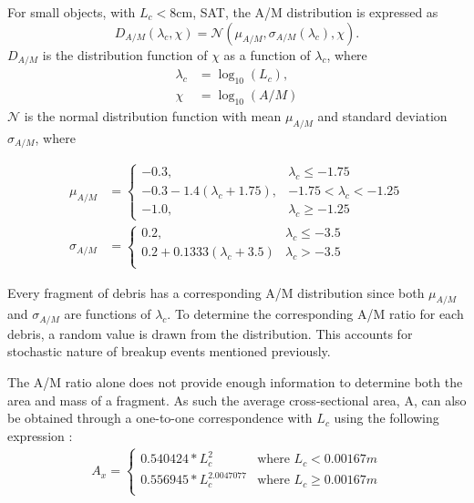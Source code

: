 \documentclass{article}
\begin{document}
For small objects, with $L_c < 8$cm, SAT, the A/M distribution is expressed as
\begin{equation}
	D_{A/M}(\lambda_c, \chi) = \mathcal{N}(\mu_{A/M}, \sigma_{A/M}(\lambda_c), \chi).
\end{equation}
$D_{A/M}$ is the distribution function of $\chi$ as a function of $\lambda_c$, where
\begin{align}
	\lambda_c &= \log_{10}(L_c),\\
	\chi &= \log_{10}(A/M)
\end{align}
$\mathcal{N}$ is the normal distribution function with mean $\mu_{A/M}$ and standard deviation $\sigma_{A/M}$, where

\begin{align}
	 \mu_{A/M} &= \begin{cases} 
		-0.3, & \lambda_c\leq -1.75 \\
		-0.3 - 1.4(\lambda_c + 1.75), & -1.75 < \lambda_c <-1.25 \\
		-1.0, & \lambda_c \geq -1.25 
	\end{cases}\\
	\sigma_{A/M} &= \begin{cases} 
		0.2, & \lambda_c \leq -3.5 \\
		0.2 + 0.1333(\lambda_c + 3.5) & \lambda_c > -3.5 \\
	\end{cases}
\end{align}

Every fragment of debris has a corresponding A/M distribution since both $\mu_{A/M}$ and $\sigma_{A/M}$ are functions of $\lambda_c$. To determine the corresponding A/M ratio for each debris, a random value is drawn from the distribution. This accounts for stochastic nature of breakup events mentioned previously. 

The A/M ratio alone does not provide enough information to determine both the area and mass of a fragment. As such the average cross-sectional area, A, can also be obtained through a one-to-one correspondence with $L_c$ using the following expression \citep{johnson_nasas_2001}:
\begin{align}
	A_x = \begin{cases}
		0.540424 * L_c^2 & \text{where } L_c < 0.00167 m \\
		0.556945 * L_c^{2.0047077} & \text{where } L_c \geq 0.00167 m \\
	\end{cases}
\end{align}
\end{document}
